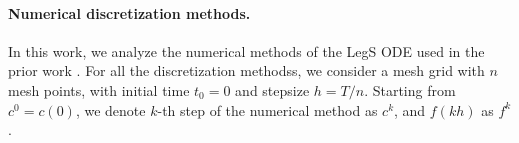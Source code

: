 \documentclass{article}
\theoremstyle{definition}
\begin{document}






\paragraph{Numerical discretization methods.} 
In this work, we analyze the numerical methods of the LegS ODE used in the prior work \citep{gu2020hippo}. For all the discretization methodss, we consider a mesh grid with $n$ mesh points, with initial time $t_0=0$ and stepsize $h = T/n$. Starting from $c^0=c(0)$, we denote $k$-th step of the numerical method as $c^k$, and $f(kh)$ as $f^k$.
\end{document}
